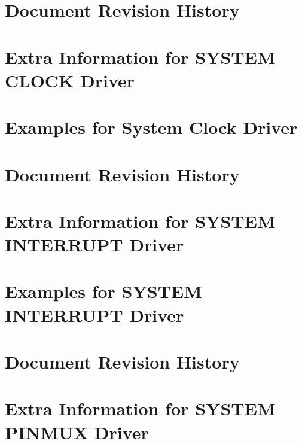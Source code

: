 \let\mypdfximage\pdfximage\def\pdfximage{\immediate\mypdfximage}\documentclass[twoside]{book}
\newcommand{\+}{\discretionary{\mbox{\scriptsize$\hookleftarrow$}}{}{}}
\begin{document}
\chapter{Document Revision History}
\label{asfdoc_sam0_sercom_usart_document_revision_history}

\chapter{Extra Information for S\+Y\+S\+T\+EM C\+L\+O\+CK Driver}
\label{asfdoc_sam0_system_clock_extra}

\chapter{Examples for System Clock Driver}
\label{asfdoc_sam0_system_clock_exqsg}

\chapter{Document Revision History}
\label{asfdoc_sam0_system_clock_document_revision_history}

\chapter{Extra Information for S\+Y\+S\+T\+EM I\+N\+T\+E\+R\+R\+U\+PT Driver}
\label{asfdoc_sam0_system_interrupt_extra}

\chapter{Examples for S\+Y\+S\+T\+EM I\+N\+T\+E\+R\+R\+U\+PT Driver}
\label{asfdoc_sam0_system_interrupt_exqsg}

\chapter{Document Revision History}
\label{asfdoc_sam0_system_interrupt_document_revision_history}

\chapter{Extra Information for S\+Y\+S\+T\+EM P\+I\+N\+M\+UX Driver}
\label{asfdoc_sam0_system_pinmux_extra}

\end{document}
